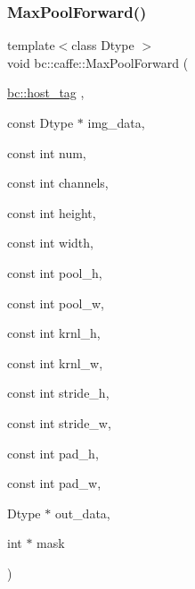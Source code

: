 \mbox{\label{namespacebc_1_1caffe_aba6971ea7a2796ad0ab683b9b63a9270}} 
\subsubsection{\texorpdfstring{Max\+Pool\+Forward()}{MaxPoolForward()}}
{\footnotesize\ttfamily template$<$class Dtype $>$ \\
void bc\+::caffe\+::\+Max\+Pool\+Forward (\begin{DoxyParamCaption}\item[{\hyperlink{structbc_1_1host__tag}{bc\+::host\+\_\+tag}}]{,  }\item[{const Dtype $\ast$}]{img\+\_\+data,  }\item[{const int}]{num,  }\item[{const int}]{channels,  }\item[{const int}]{height,  }\item[{const int}]{width,  }\item[{const int}]{pool\+\_\+h,  }\item[{const int}]{pool\+\_\+w,  }\item[{const int}]{krnl\+\_\+h,  }\item[{const int}]{krnl\+\_\+w,  }\item[{const int}]{stride\+\_\+h,  }\item[{const int}]{stride\+\_\+w,  }\item[{const int}]{pad\+\_\+h,  }\item[{const int}]{pad\+\_\+w,  }\item[{Dtype $\ast$}]{out\+\_\+data,  }\item[{int $\ast$}]{mask }\end{DoxyParamCaption})}

